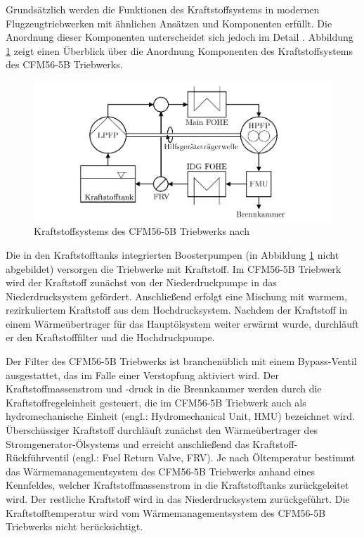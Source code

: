Grundsätzlich werden die Funktionen des Kraftstoffsystems in modernen Flugzeugtriebwerken mit ähnlichen Ansätzen und Komponenten erfüllt. Die Anordnung dieser Komponenten unterscheidet sich jedoch im Detail \cite{LinkeDiesinger.2014}. Abbildung \ref{fig:2.1} zeigt einen Überblick über die Anordnung Komponenten des Kraftstoffsystems des CFM56-5B Triebwerks. 

\begin{figure}[ht]
\centering
\includegraphics[width=1\linewidth]{4_Abbildungen/2_Hauptteil/Kraftstoffsystem Abbildungen/CFM56 Kraftstoffsystem 2.pdf}
  \caption{Kraftstoffsystems des CFM56-5B Triebwerks nach \cite{LinkeDiesinger.2014}}
  \label{fig:2.1}
\end{figure}
\FloatBarrier

Die in den Kraftstofftanks integrierten Boosterpumpen (in Abbildung \ref{fig:2.1} nicht abgebildet) versorgen die Triebwerke mit Kraftstoff. Im CFM56-5B Triebwerk wird der Kraftstoff zunächst von der Niederdruckpumpe in das Niederdrucksystem gefördert. Anschließend erfolgt eine Mischung mit warmem, rezirkuliertem Kraftstoff aus dem Hochdrucksystem. Nachdem der Kraftstoff in einem Wärmeübertrager für das Hauptölsystem weiter erwärmt wurde, durchläuft er den Kraftstofffilter und die Hochdruckpumpe.

Der Filter des CFM56-5B Triebwerks ist branchenüblich mit einem Bypass-Ventil ausgestattet, das im Falle einer Verstopfung aktiviert wird. Der Kraftstoffmassenstrom und -druck in die Brennkammer werden durch die Kraftstoffregeleinheit gesteuert, die im CFM56-5B Triebwerk auch als hydromechanische Einheit (engl.: Hydromechanical Unit, HMU) bezeichnet wird. Überschüssiger Kraftstoff durchläuft zunächst den Wärmeübertrager des Stromgenerator-Ölsystems und erreicht anschließend das Kraftstoff-Rückführventil (engl.: Fuel Return Valve, FRV). Je nach Öltemperatur bestimmt das Wärmemanagementsystem des CFM56-5B Triebwerks anhand eines Kennfeldes, welcher Kraftstoffmassenstrom in die Kraftstofftanks zurückgeleitet wird. Der restliche Kraftstoff wird in das Niederdrucksystem zurückgeführt. Die Kraftstofftemperatur wird vom Wärmemanagementsystem des CFM56-5B Triebwerks nicht berücksichtigt. \cite{Braunling.2015, LinkeDiesinger.2014}

